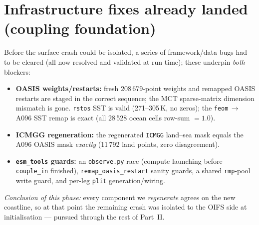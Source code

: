 \documentclass[11pt,a4paper]{article}
\newcommand{\code}[1]{\texttt{\small #1}}
\begin{document}
\section{Infrastructure fixes already landed (coupling foundation)}\label{sec:oifs}
Before the surface crash could be isolated, a series of framework/data bugs had to be
cleared (all now resolved and validated at run time); these underpin \emph{both} blockers:
\begin{itemize}[leftmargin=1.4em,itemsep=1pt]
  \item \textbf{OASIS weights/restarts:} fresh 208\,679-point weights and remapped OASIS
        restarts are staged in the correct sequence; the MCT sparse-matrix dimension
        mismatch is gone. \code{rstos} SST is valid (271--305\,K, no zeros); the
        \code{feom}\,$\to$\,A096 SST remap is exact (all 28\,528 ocean cells row-sum
        $=1.0$).
  \item \textbf{ICMGG regeneration:} the regenerated \code{ICMGG} land--sea mask equals
        the A096 OASIS mask \emph{exactly} (11\,792 land points, zero disagreement).
  \item \textbf{\code{esm\_tools} guards:} an \code{observe.py} race (compute launching
        before \code{couple\_in} finished), \code{remap\_oasis\_restart} sanity guards,
        a shared \code{rmp}-pool write guard, and per-leg \code{plit} generation/wiring.
\end{itemize}
\emph{Conclusion of this phase:} every component we \emph{regenerate} agrees on the new
coastline, so at that point the remaining crash was isolated to the OIFS side at
initialisation --- pursued through the rest of Part~II.
\end{document}
